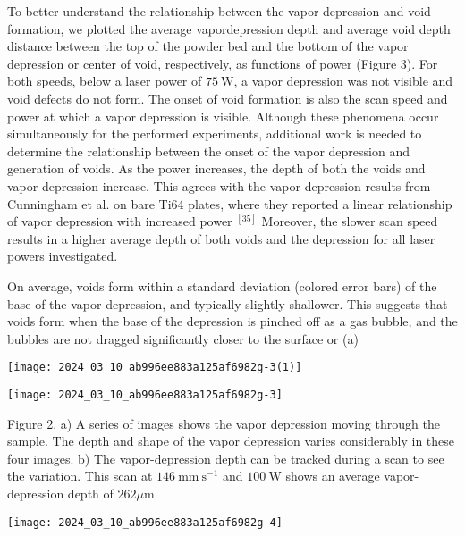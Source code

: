 \documentclass[10pt]{article}
\begin{document}
To better understand the relationship between the vapor depression and void formation, we plotted the average vapordepression depth and average void depth distance between the top of the powder bed and the bottom of the vapor depression or center of void, respectively, as functions of power (Figure 3). For both speeds, below a laser power of $75 \mathrm{~W}$, a vapor depression was not visible and void defects do not form. The onset of void formation is also the scan speed and power at which a vapor depression is visible. Although these phenomena occur simultaneously for the performed experiments, additional work is needed to determine the relationship between the onset of the vapor depression and generation of voids. As the power increases, the depth of both the voids and vapor depression increase. This agrees with the vapor depression results from Cunningham et al. on bare Ti64 plates, where they reported a linear relationship of vapor depression with increased power ${ }^{[35]}$ Moreover, the slower scan speed results in a higher average depth of both voids and the depression for all laser powers investigated.

On average, voids form within a standard deviation (colored error bars) of the base of the vapor depression, and typically slightly shallower. This suggests that voids form when the base of the depression is pinched off as a gas bubble, and the bubbles are not dragged significantly closer to the surface or (a)

\begin{center}
\texttt{[image: 2024\_03\_10\_ab996ee883a125af6982g-3(1)]}
\end{center}

\begin{center}
\texttt{[image: 2024\_03\_10\_ab996ee883a125af6982g-3]}
\end{center}

Figure 2. a) A series of images shows the vapor depression moving through the sample. The depth and shape of the vapor depression varies considerably in these four images. b) The vapor-depression depth can be tracked during a scan to see the variation. This scan at $146 \mathrm{~mm} \mathrm{~s}^{-1}$ and $100 \mathrm{~W}$ shows an average vapor-depression depth of $262 \mu \mathrm{m}$.

\begin{center}
\texttt{[image: 2024\_03\_10\_ab996ee883a125af6982g-4]}
\end{center}
\end{document}
